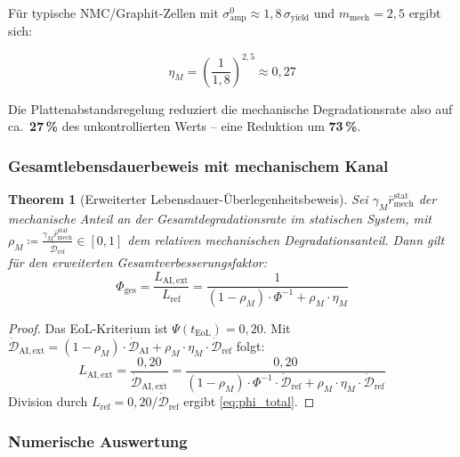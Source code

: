﻿\documentclass[12pt,a4paper]{article}
\newtheorem{theorem}{Theorem}[section]
\begin{document}
Für typische NMC/Graphit-Zellen mit $\sigma_\mathrm{amp}^0 \approx 1{,}8\,\sigma_\mathrm{yield}$
und $m_\mathrm{mech} = 2{,}5$ ergibt sich:

\begin{equation}
	\eta_M = \left(\frac{1}{1{,}8}\right)^{2{,}5} \approx 0{,}27
\end{equation}

Die Plattenabstandsregelung reduziert die mechanische Degradationsrate
also auf ca.\ \textbf{27\,\%} des unkontrollierten Werts -- eine Reduktion
um \textbf{73\,\%}.

\subsubsection{Gesamtlebensdauerbeweis mit mechanischem Kanal}

\begin{theorem}[Erweiterter Lebensdauer-Überlegenheitsbeweis]
	\label{thm:lifetime_mech}
	Sei $\gamma_M \bar{r}_\mathrm{mech}^\mathrm{stat}$ der mechanische Anteil
	an der Gesamtdegradationsrate im statischen System, mit
	$\rho_M \coloneqq \frac{\gamma_M \bar{r}_\mathrm{mech}^\mathrm{stat}}
	{\dot{\mathcal{D}}_\mathrm{ref}} \in [0,1]$ dem relativen mechanischen
	Degradationsanteil. Dann gilt für den erweiterten Gesamtverbesserungsfaktor:
	\begin{equation}
		\Phi_\mathrm{ges} = \frac{L_\mathrm{AI,ext}}{L_\mathrm{ref}}
		= \frac{1}{(1-\rho_M) \cdot \Phi^{-1} + \rho_M \cdot \eta_M}
		\label{eq:phi_total}
	\end{equation}
\end{theorem}

\begin{proof}
	Das EoL-Kriterium ist $\Psi(t_\mathrm{EoL}) = 0{,}20$. Mit
	$\dot{\mathcal{D}}_\mathrm{AI,ext} = (1-\rho_M) \cdot \dot{\mathcal{D}}_\mathrm{AI}
	+ \rho_M \cdot \eta_M \cdot \dot{\mathcal{D}}_\mathrm{ref}$ folgt:
	\[
	L_\mathrm{AI,ext} = \frac{0{,}20}{\dot{\mathcal{D}}_\mathrm{AI,ext}}
	= \frac{0{,}20}{(1-\rho_M) \cdot \Phi^{-1} \cdot \dot{\mathcal{D}}_\mathrm{ref}
		+ \rho_M \cdot \eta_M \cdot \dot{\mathcal{D}}_\mathrm{ref}}
	\]
	Division durch $L_\mathrm{ref} = 0{,}20 / \dot{\mathcal{D}}_\mathrm{ref}$
	ergibt \eqref{eq:phi_total}.
\end{proof}

\subsubsection{Numerische Auswertung}
\end{document}
